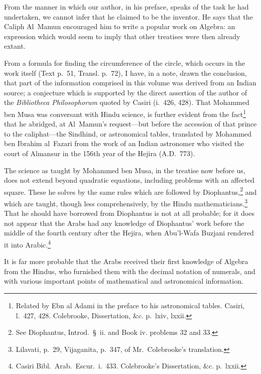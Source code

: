 From the manner in which our author, in his preface, speaks of the task he had undertaken, we cannot infer that he claimed to be the inventor. He says that the Caliph Al~Mamun encouraged him to write a popular work on Algebra: an expression which would seem to imply that other treatises were then already extant.

From a formula for finding the circumference of the circle, which occurs in the work itself (Text p.~51, Transl. p.~72), I have, in a note, drawn the conclusion, that part of the information comprised in this volume was derived from an Indian source; a conjecture which is supported by the direct assertion of the author of the \textit{Bibliotheca Philosophorum} quoted by Casiri (i.~426, 428). That Mohammed ben Musa was conversant with Hindu science, is further evident from the fact\footnote{Related by Ebn al Adami in the preface to his astronomical tables. Casiri, l.~427, 428. Colebrooke, Dissertation, \&c. p.~lxiv, lxxii.} that he abridged, at Al~Mamun's request---but before the accession of that prince to the caliphat---the Sindhind, or astronomical tables, translated by Mohammed ben Ibrahim al~Fazari from the work of an Indian astronomer who visited the court of Almansur in the 156th year of the Hejira (A.D.~773).

The science as taught by Mohammed ben Musa, in the treatise now before us, does not extend beyond quadratic equations, including problems with an affected square. These he solves by the same rules which are followed by Diophantus,\footnote{See Diophantus, Introd.~\S~ii. and Book iv. problems 32 and 33.} and which are taught, though less comprehensively, by the Hindu mathematicians.\footnote{Lilavati, p.~29, Vijaganita, p.~347, of Mr.~Colebrooke's translation.} That he should have borrowed from Diophantus is not at all probable; for it does not appear that the Arabs had any knowledge of Diophantus' work before the middle of the fourth century after the Hejira, when Abu'l-Wafa Buzjani rendered it into Arabic.\footnote{Casiri Bibl.~Arab.~Escur.~i.~433. Colebrooke's Dissertation, \&c. p.~lxxii.}

It is far more probable that the Arabs received their first knowledge of Algebra from the Hindus, who furnished them with the decimal notation of numerals, and with various important points of mathematical and astronomical information.

